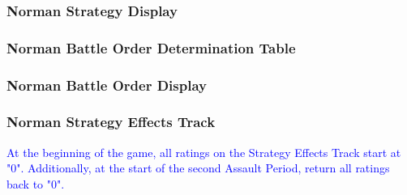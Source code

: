 \subsubsection{Norman Strategy Display}

\subsubsection{Norman Battle Order Determination Table}

\subsubsection{Norman Battle Order Display}

\subsubsection{Norman Strategy Effects Track}
\hfill

\textcolor{blue}{At the beginning of the game, all ratings on the Strategy Effects Track start at "0". Additionally, at the start of the second Assault Period, return all ratings back to "0".}
